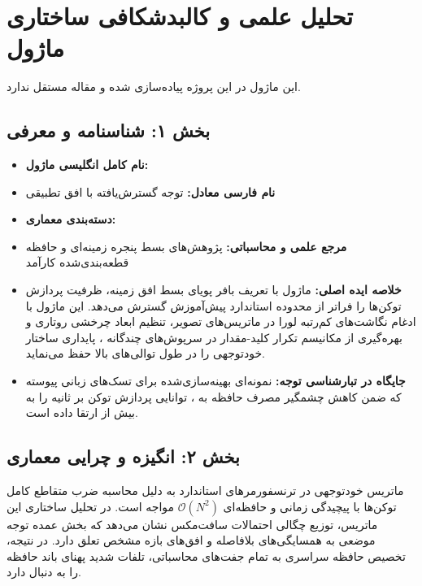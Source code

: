 \section{تحلیل علمی و کالبدشکافی ساختاری ماژول }

این ماژول در این پروژه پیاده‌سازی شده و مقاله مستقل ندارد.
\label{sec:span_expanded_attention}

\subsection*{بخش ۱: شناسنامه و معرفی }
\begin{itemize}
    \item \textbf{نام کامل انگلیسی ماژول:} 
    \item \textbf{نام فارسی معادل:} توجه گسترش‌یافته با افق تطبیقی 
    \item \textbf{دسته‌بندی معماری:} 
    \item \textbf{مرجع علمی و محاسباتی:} پژوهش‌های بسط پنجره زمینه‌ای و حافظه قطعه‌بندی‌شده کارآمد 
    \item \textbf{خلاصه ایده اصلی:} ماژول  با تعریف بافر پویای بسط افق زمینه، ظرفیت پردازش توکن‌ها را فراتر از محدوده استاندارد پیش‌آموزش گسترش می‌دهد. این ماژول با ادغام نگاشت‌های کم‌رتبه لورا  در ماتریس‌های تصویر، تنظیم ابعاد چرخشی روتاری  و بهره‌گیری از مکانیسم تکرار کلید-مقدار در سرپوش‌های چندگانه ، پایداری ساختار خودتوجهی را در طول توالی‌های بالا حفظ می‌نماید.
    \item \textbf{جایگاه در تبارشناسی توجه:} نمونه‌ای بهینه‌سازی‌شده برای تسک‌های زبانی پیوسته که ضمن کاهش چشمگیر مصرف حافظه به ، توانایی پردازش توکن بر ثانیه را به بیش از  ارتقا داده است.
\end{itemize}

\subsection*{بخش ۲: انگیزه و چرایی معماری }
ماتریس خودتوجهی در ترنسفورمرهای استاندارد به دلیل محاسبه ضرب متقاطع کامل توکن‌ها با پیچیدگی زمانی و حافظه‌ای $\mathcal{O}(N^2)$ مواجه است. در تحلیل ساختاری این ماتریس، توزیع چگالی احتمالات سافت‌مکس نشان می‌دهد که بخش عمده توجه موضعی به همسایگی‌های بلافاصله و افق‌های بازه مشخص تعلق دارد. در نتیجه، تخصیص حافظه سراسری به تمام جفت‌های محاسباتی، تلفات شدید پهنای باند حافظه  را به دنبال دارد.

